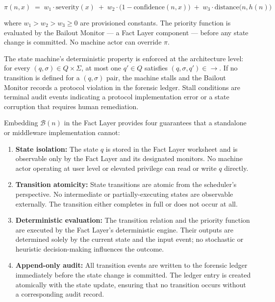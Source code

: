 \begin{equation}
\pi(n, x) \;=\; w_1 \cdot \text{severity}(x) \;+\; w_2 \cdot \bigl(1 - \text{confidence}(n, x)\bigr) \;+\; w_3 \cdot \text{distance}\bigl(n, h(n)\bigr)
\tag{PF}
\end{equation}

where $w_1 > w_2 > w_3 \geq 0$ are provisioned constants. The priority function is
evaluated by the Bailout Monitor — a Fact Layer component — before any state change
is committed. No machine actor can override $\pi$.

The state machine's deterministic property is enforced at the architecture level:
for every $(q, \sigma) \in Q \times \Sigma$, at most one $q' \in Q$ satisfies
$(q, \sigma, q') \in \rightarrow$. If no transition is defined for a $(q, \sigma)$
pair, the machine stalls and the Bailout Monitor records a protocol violation in
the forensic ledger. Stall conditions are terminal audit events indicating a
protocol implementation error or a state corruption that requires human remediation.

Embedding $\mathcal{B}(n)$ in the Fact Layer provides four guarantees that a
standalone or middleware implementation cannot:

\begin{enumerate}
\item \textbf{State isolation:} The state $q$ is stored in the Fact Layer worksheet
  and is observable only by the Fact Layer and its designated monitors. No machine
  actor operating at user level or elevated privilege can read or write $q$ directly.
\item \textbf{Transition atomicity:} State transitions are atomic from the
  scheduler's perspective. No intermediate or partially-executing states are
  observable externally. The transition either completes in full or does not occur
  at all.
\item \textbf{Deterministic evaluation:} The transition relation and the priority
  function are executed by the Fact Layer's deterministic engine. Their outputs are
  determined solely by the current state and the input event; no stochastic or
  heuristic decision-making influences the outcome.
\item \textbf{Append-only audit:} All transition events are written to the forensic
  ledger immediately before the state change is committed. The ledger entry is
  created atomically with the state update, ensuring that no transition occurs
  without a corresponding audit record.
\end{enumerate}

